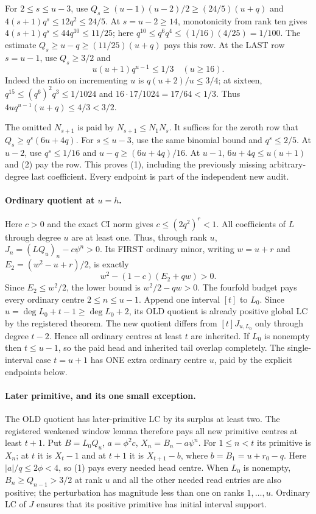 For $2\le s\le u-3$, use
$Q_s\ge(u-1)(u-2)/2\ge(24/5)(u+q)$ and
$4(s+1)q^s\le12q^2\le24/5$.
At $s=u-2\ge14$, monotonicity from rank ten gives
$4(s+1)q^s\le44q^{10}\le11/25$; here
$q^{10}\le q^6q^4\le(1/16)(4/25)=1/100$.
The estimate $Q_s\ge u-q\ge(11/25)(u+q)$ pays this row.
At the LAST row $s=u-1$, use $Q_s\ge3/2$ and
\[
 u(u+1)q^{u-1}\le1/3\quad(u\ge16).                 \tag{2}
\]
Indeed the ratio on incrementing $u$ is $q(u+2)/u\le3/4$;
at sixteen, $q^{15}\le(q^6)^2q^3\le1/1024$ and
$16\cdot17/1024=17/64<1/3$.
Thus $4u q^{u-1}(u+q)\le4/3<3/2$.

The omitted $N_{s+1}$ is paid by $N_{s+1}\le N_1N_s$.
It suffices for the zeroth row that
$Q_s\ge q^s(6u+4q)$.
For $s\le u-3$, use the same binomial bound and $q^s\le2/5$.
At $u-2$, use $q^s\le1/16$ and
$u-q\ge(6u+4q)/16$.
At $u-1$, $6u+4q\le u(u+1)$ and (2) pay the row.
This proves (1), including the previously missing arbitrary-degree
last coefficient. Every endpoint is part of the independent new audit.

\paragraph{Ordinary quotient at $u=h$.}
Here $c>0$ and the exact CI norm gives
$c\le(2q^2)^r<1$. All coefficients of $L$ through degree $u$
are at least one. Thus, through rank $u$,
$J_n=(LQ_u)_n-c\psi^n>0$.
Its FIRST ordinary minor, writing $w=u+r$ and
$E_2=(w^2-u+r)/2$, is exactly
\[
                    w^2-(1-c)(E_2+qw)>0.             \tag{3}
\]
Since $E_2\le w^2/2$, the lower bound is $w^2/2-qw>0$.
The fourfold budget pays every ordinary centre $2\le n\le u-1$.
Append one interval $[t]$ to $L_0$. Since
$u=\deg L_0+t-1\ge\deg L_0+2$, its OLD quotient is already
positive global LC by the registered theorem. The new quotient
differs from $[t]J_{u,L_0}$ only through degree $t-2$.
Hence all ordinary centres at least $t$ are inherited. If $L_0$
is nonempty then $t\le u-1$, so the paid head and inherited tail
overlap completely. The single-interval case $t=u+1$ has ONE extra
ordinary centre $u$, paid by the explicit endpoints below.

\paragraph{Later primitive, and its one small exception.}
The OLD quotient has later-primitive LC by its surplus at least two.
The registered weakened window lemma therefore pays all new primitive
centres at least $t+1$. Put $B=L_0Q_u$, $a=\phi^2c$,
$X_n=B_n-a\psi^n$. For $1\le n<t$ its primitive is $X_n$;
at $t$ it is $X_t-1$ and at $t+1$ it is $X_{t+1}-b$,
where $b=B_1=u+r_0-q$. Here $|a|/q\le2\phi<4$, so (1)
pays every needed head centre. When $L_0$ is nonempty,
$B_n\ge Q_{n-1}>3/2$ at rank $u$ and all the other needed
read entries are also positive; the perturbation has magnitude less
than one on ranks $1,\ldots,u$. Ordinary LC of $J$ ensures that
its positive primitive has initial interval support.

